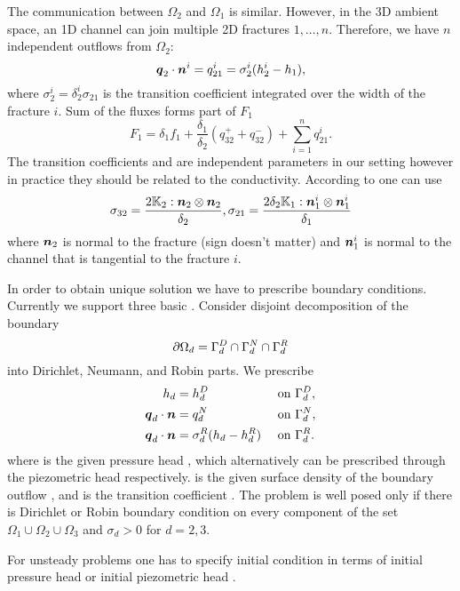 The communication between $\Omega_2$  and  $\Omega_1$ is similar.  However, in the 3D ambient space,
an 1D channel can join multiple 2D fractures $1,\dots, n$. Therefore, we have $n$
independent outflows from $\Omega_2$:
\begin{equation*}
        \mathbf{\boldsymbol{q}}_2\cdot \mathbf{\boldsymbol{n}}^{i} = q_{21}^{i} =\sigma_{2}^{i} (h_2^{i}-h_1),
\end{equation*}
where $\sigma_2^{i}=\delta_2^{i}\sigma_{21}$  is the transition coefficient integrated over 
the width of the fracture $i$. Sum of the fluxes forms part of $F_1$ 
\begin{equation}
   \label{source_1D}
   F_1 = \delta_1 f_1 + \frac{\delta_1}{\delta_2}(q_{32}^+ + q_{32}^-) + \sum_{i=1}^n q_{21}^{i}. 
\end{equation}
The transition coefficients 
  and
  are independent parameters in our setting however in practice
they should be related to the conductivity. According to 
\cite{martin_modeling_2005} one can use
\[
\label{e:sigma_law}
  \sigma_{32} = \frac{2\tn K_2 :\vc n_2\otimes\vc n_2 }{\delta_2}, \sigma_{21} = \frac{2\delta_2\tn K_1:{\vc n_1^i}\otimes{\vc n_1^i}}{\delta_1}
\]
where $\mathbf{\boldsymbol{n}}_2$ is normal to the fracture (sign doesn't matter) and $\mathbf{\boldsymbol{n}}_1^i$ is normal to the channel that is tangential to the fracture $i$.

In order to obtain unique solution we have to prescribe boundary conditions. Currently we support three basic 
. 
Consider disjoint decomposition of the boundary
\[
    \partial\Omega_d = \Gamma_d^D \cap \Gamma_d^N \cap \Gamma_d^R
\]
into Dirichlet, Neumann, and Robin parts. We prescribe
\begin{align}
    h_d &= h_d^D        &&\text{ on }\Gamma_d^D,\\
    \mathbf{\boldsymbol{q}}_d \cdot \mathbf{\boldsymbol{n}} &= q_d^N         &&\text{ on }\Gamma_d^N,\\
    \mathbf{\boldsymbol{q}}_d \cdot \mathbf{\boldsymbol{n}} &= \sigma_d^R ( h_d - h_d^R)     &&\text{ on }\Gamma_d^R.
\end{align}
where 
is the given pressure head , which alternatively can be prescribed through the piezometric head 
respectively. 
is the given surface density of the boundary outflow , and  
is the transition coefficient .
The problem is well posed only if there is Dirichlet or Robin boundary condition on every component of the set $\Omega_1 \cup \Omega_2 \cup \Omega_3$ and $\sigma_d >0$ for 
$d=2,3$.

For unsteady problems one has to specify initial condition in terms of initial pressure head 
or initial piezometric head 
.




